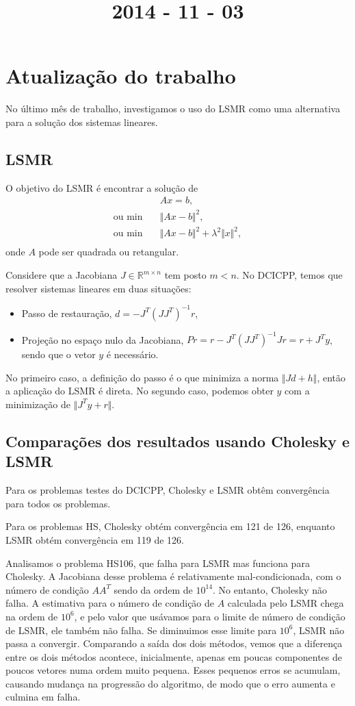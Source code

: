 \documentclass{article}
\title{2014 - 11 - 03}
\author{}
\date{}
\newcommand{\norma}[1]{\Vert{#1}\Vert}
\begin{document}
\maketitle
\section{Atualização do trabalho}

No último mês de trabalho, investigamos o uso do LSMR como uma alternativa para
a solução dos sistemas lineares.

\subsection{LSMR}

O objetivo do LSMR é encontrar a solução de
\begin{align*}
  & Ax = b, \\
  \mbox{ou } \min \quad & \norma{Ax - b}^2, \\
  \mbox{ou } \min \quad & \norma{Ax - b}^2 + \lambda^2\norma{x}^2, \\
\end{align*}
onde $A$ pode ser quadrada ou retangular.

Considere que a Jacobiana $J \in \mathbb{R}^{m\times n}$ tem posto $m<n$.
No DCICPP, temos que resolver sistemas lineares em duas situações:
\begin{itemize}
  \item Passo de restauração, $d = -J^T(JJ^T)^{-1}r$,
  \item Projeção no espaço nulo da Jacobiana, $Pr = r - J^T(JJ^T)^{-1}Jr = r +
    J^Ty$, sendo que o vetor $y$ é necessário.
\end{itemize}
No primeiro caso, a definição do passo é o que minimiza a norma $\norma{Jd +
h}$, então a aplicação do LSMR é direta.
No segundo caso, podemos obter $y$ com a minimização de $\norma{J^Ty + r}$.

\subsection{Comparações dos resultados usando Cholesky e LSMR}

Para os problemas testes do DCICPP, Cholesky e LSMR obtêm convergência para
todos os problemas.

Para os problemas HS, Cholesky obtém convergência em 121 de 126, enquanto LSMR
obtém convergência em 119 de 126.

Analisamos o problema HS106, que falha para LSMR mas funciona para Cholesky.
A Jacobiana desse problema é relativamente mal-condicionada, com o número de
condição $AA^T$ sendo da ordem de $10^{14}$. No entanto, Cholesky não falha.
A estimativa para o número de condição de $A$ calculada pelo LSMR chega na ordem
de $10^6$, e pelo valor que usávamos para o limite de número de condição de
LSMR, ele também não falha. Se diminuimos esse limite para $10^6$, LSMR não
passa a convergir. Comparando a saída dos dois métodos, vemos que a diferença
entre os dois métodos acontece, inicialmente, apenas em poucas componentes de
poucos vetores numa ordem muito pequena. Esses pequenos erros se acumulam,
causando mudança na progressão do algoritmo, de modo que o erro aumenta e
culmina em falha.
\end{document}
